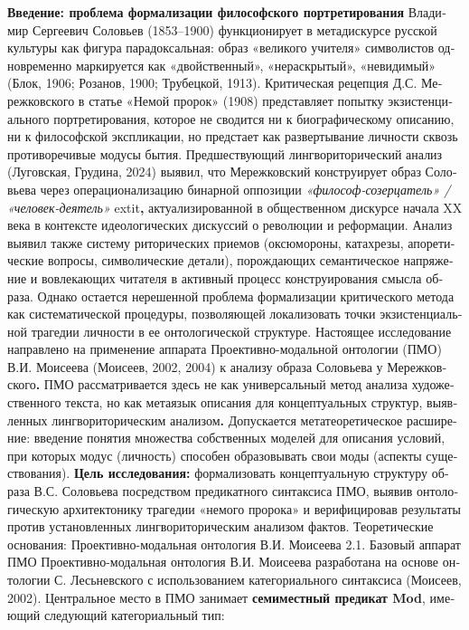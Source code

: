 \begin{russian}
    \textbf{Введение: проблема формализации философского портретирования}
    Владимир Сергеевич Соловьев (1853–1900) функционирует в метадискурсе русской культуры как фигура парадоксальная: образ «великого учителя» символистов одновременно маркируется как «двойственный», «нераскрытый», «невидимый» (Блок, 1906; Розанов, 1900; Трубецкой, 1913). Критическая рецепция Д.С. Мережковского в статье «Немой пророк» (1908) представляет попытку экзистенциального портретирования, которое не сводится ни к биографическому описанию, ни к философской экспликации, но предстает как развертывание личности сквозь противоречивые модусы бытия.
    Предшествующий лингвориторический анализ (Луговская, Грудина, 2024) выявил, что Мережковский конструирует образ Соловьева через операционализацию бинарной оппозиции \textit{«философ-созерцатель» / «человек-деятель»}	extit{\textbf{,}} актуализированной в общественном дискурсе начала XX века в контексте идеологических дискуссий о революции и реформации. Анализ выявил также систему риторических приемов (оксюмороны, катахрезы, апоретические вопросы, символические детали), порождающих семантическое напряжение и вовлекающих читателя в активный процесс конструирования смысла образа.
    Однако остается нерешенной проблема формализации критического метода как систематической процедуры, позволяющей локализовать точки экзистенциальной трагедии личности в ее онтологической структуре.
    Настоящее исследование направлено на применение аппарата Проективно-модальной онтологии (ПМО) В.И. Моисеева (Моисеев, 2002, 2004) к анализу образа Соловьева у Мережковского\textbf{. }ПМО рассматривается здесь не как универсальный метод анализа художественного текста, но как метаязык описания для концептуальных структур, выявленных лингвориторическим анализом\textbf{.} Допускается метатеоретическое расширение: введение понятия множества собственных моделей для описания условий, при которых модус (личность) способен образовывать свои моды (аспекты существования).
    \textbf{Цель исследования:} формализовать концептуальную структуру образа В.С. Соловьева посредством предикатного синтаксиса ПМО, выявив онтологическую архитектонику трагедии «немого пророка» и верифицировав результаты против установленных лингвориторическим анализом фактов.
    Теоретические основания: Проективно-модальная онтология В.И. Моисеева
    2.1. Базовый аппарат ПМО
    Проективно-модальная онтология В.И. Моисеева разработана на основе онтологии С. Лесьневского с использованием категориального синтаксиса (Моисеев, 2002). Центральное место в ПМО занимает \textbf{семиместный предикат Mod}, имеющий следующий категориальный тип:

\end{russian}
